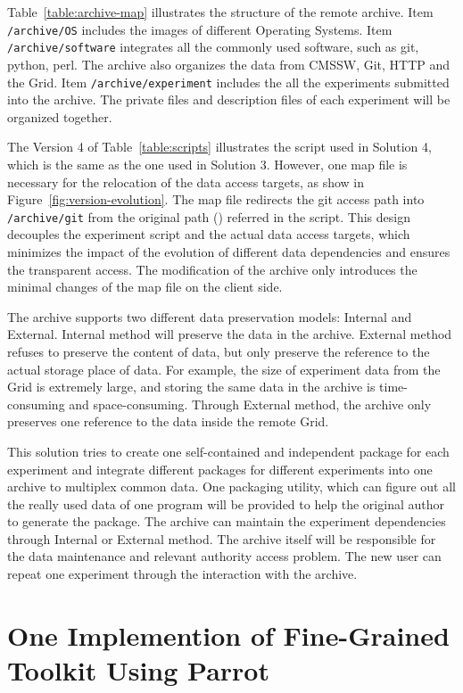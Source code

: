 \documentclass{acm_proc_article-sp}
\begin{document}
Table~\ref{table:archive-map} illustrates the structure of the remote archive.
Item {\tt /archive/OS} includes the images of different Operating Systems.
Item {\tt /archive/software} integrates all the commonly used software, such as git,
python, perl. The archive also organizes the data from CMSSW, Git, HTTP and the
Grid. Item {\tt /archive/experiment} includes the all the experiments submitted into the
archive. The private files and description files of each experiment will be
organized together.

The Version 4 of Table~\ref{table:scripts} illustrates the script used in
Solution 4, which is the same as the one used in Solution 3. 
However, one map file is necessary for the relocation of the data access targets, as
show in Figure~\ref{fig:version-evolution}. 
The map file redirects the git access path into {\tt /archive/git} from the original path () referred in the script.
This design decouples the experiment script and the actual data access targets, which minimizes the impact of the evolution of different data dependencies
and ensures the transparent access.
The modification of the archive only introduces the minimal changes of the map file on the client side.

The archive supports two different data preservation models: Internal and External. Internal method will preserve the data in the archive. External method refuses to preserve the content of data, but only preserve the reference to the actual storage place of data. For example, the size of experiment data from the Grid is extremely large, and storing the same data in the archive is time-consuming and space-consuming. Through External method, the archive only preserves one reference to the data inside the remote Grid.

This solution tries to create one self-contained and independent package for
each experiment and integrate different packages for different experiments into
one archive to multiplex common data. One packaging utility, which can figure out all the really used data of one program  will be provided
to help the original author to generate the package. The archive can maintain
the experiment dependencies through Internal or External method. The archive
itself will be responsible for the data maintenance and relevant authority
access problem. The new user can repeat one experiment through the
interaction with the archive.

\section{One Implemention of Fine-Grained Toolkit Using Parrot}
\end{document}
